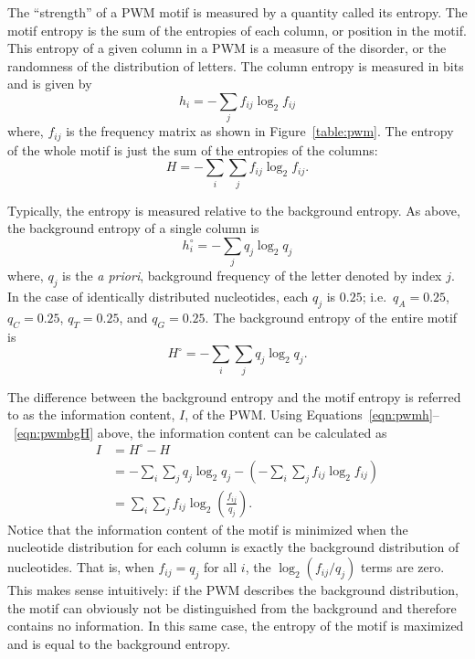     The ``strength'' of a PWM motif is measured by a quantity called
    its entropy.  The motif entropy is the sum of the entropies of
    each column, or position in the motif.
    This entropy of a given column in a PWM is a measure of the
    disorder, or the randomness of the distribution of letters.  The
    column entropy is measured in bits and is given by
        \begin{equation}\label{eqn:pwmh}
            h_i = -\sum_{j} f_{ij}\log_2 f_{ij}
        \end{equation}
    where, $f_{ij}$ is the frequency matrix as shown in
    Figure~\vref{table:pwm}.  The entropy of the whole motif
    is just the sum of the entropies of the columns:
        \begin{equation}\label{eqn:pwmH}
            H = -\sum_{i}\sum_{j} f_{ij}\log_2 f_{ij}.
        \end{equation}

    Typically, the entropy is measured
    relative to the background entropy.  As above, the background
    entropy of a single column is
        \begin{equation}\label{eqn:pwmbgh}
            h_i^\circ = -\sum_{j} q_{j}\log_2 q_{j}
        \end{equation}
    where, $q_{j}$ is the \emph{a priori}, background frequency of
    the letter denoted by index $j$.  In the case of identically
    distributed nucleotides, each $q_j$ is $0.25$; i.e.\ $q_A=0.25$,
    $q_C=0.25$, $q_T=0.25$, and $q_G=0.25$.  The background entropy
    of the entire motif is
        \begin{equation}\label{eqn:pwmbgH}
            H^{\circ} = -\sum_{i}\sum_{j} q_j\log_2 q_j.
        \end{equation}

    The difference between the background entropy and the motif
    entropy is referred to as the information content, $I$, of the PWM\@.
    Using Equations~\ref{eqn:pwmh}--~\ref{eqn:pwmbgH} above, the
    information content can be calculated as
        \begin{equation}\label{eqn:pwmI}
            \begin{split}
              I &=  H^{\circ}-H\\
                &= -\sum_{i}\sum_{j} q_j\log_2 q_j - \left(-\sum_{i}\sum_{j}f_{ij}\log_2 f_{ij}\right)\\
                &= \sum_{i}\sum_{j}f_{ij}\log_2
                \left(\frac{f_{ij}}{q_j}\right).
            \end{split}
        \end{equation}
    Notice that the information content of the motif is minimized
    when the nucleotide distribution for each column is exactly the
    background distribution of nucleotides.  That is, when $f_{ij}=q_j$
    for all $i$, the $\log_2(f_{ij}/q_j)$ terms are zero.
    This makes sense intuitively: if the PWM describes the
    background distribution, the motif can obviously not be
    distinguished from the background and therefore contains no
    information.  In this same case, the entropy of the motif is
    maximized and is equal to the background entropy.

